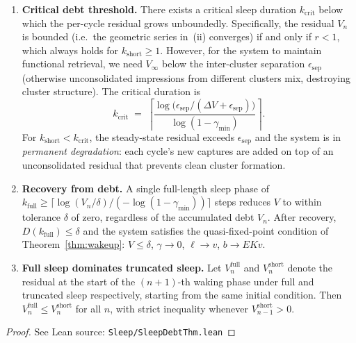 \begin{theorem}
\begin{enumerate}
\item \textbf{Critical debt threshold.}  There exists a critical sleep duration $k_{\mathrm{crit}}$ below which the per-cycle residual grows unboundedly.  Specifically, the residual $V_n$ is bounded (i.e.\ the geometric series in~(ii) converges) if and only if $r < 1$, which always holds for $k_{\mathrm{short}} \geq 1$.  However, for the system to maintain functional retrieval, we need $V_{\infty}$ below the inter-cluster separation $\epsilon_{\mathrm{sep}}$ (otherwise unconsolidated impressions from different clusters mix, destroying cluster structure).  The critical duration is
\[
k_{\mathrm{crit}} \;=\; \left\lceil\frac{\log\!\bigl(\epsilon_{\mathrm{sep}} / (\Delta V + \epsilon_{\mathrm{sep}})\bigr)}{\log(1 - \gamma_{\min})}\right\rceil.
\]
For $k_{\mathrm{short}} < k_{\mathrm{crit}}$, the steady-state residual exceeds $\epsilon_{\mathrm{sep}}$ and the system is in \emph{permanent degradation}: each cycle's new captures are added on top of an unconsolidated residual that prevents clean cluster formation.

\item \textbf{Recovery from debt.}  A single full-length sleep phase of $k_{\mathrm{full}} \geq \lceil \log(V_n / \delta) / (-\log(1 - \gamma_{\min}))\rceil$ steps reduces $V$ to within tolerance $\delta$ of zero, regardless of the accumulated debt $V_n$.  After recovery, $D(k_{\mathrm{full}}) \leq \delta$ and the system satisfies the quasi-fixed-point condition of Theorem~\ref{thm:wakeup}: $V \leq \delta$, $\gamma \to 0$, $\ell \to v$, $b \to EKv$.

\item \textbf{Full sleep dominates truncated sleep.}  Let $V_n^{\mathrm{full}}$ and $V_n^{\mathrm{short}}$ denote the residual at the start of the $(n+1)$-th waking phase under full and truncated sleep respectively, starting from the same initial condition.  Then $V_n^{\mathrm{full}} \leq V_n^{\mathrm{short}}$ for all $n$, with strict inequality whenever $V_{n-1}^{\mathrm{short}} > 0$.
\end{enumerate}
\end{theorem}

\begin{proof}
\leanok
{}
See Lean source: \texttt{Sleep/SleepDebtThm.lean}
\end{proof}

